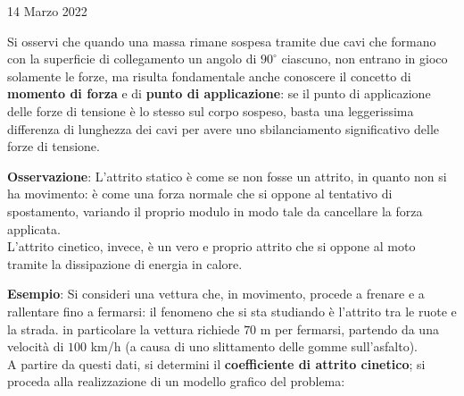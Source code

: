 \documentclass[a4paper]{extarticle}
\begin{document}
\newpage
\noindent
\begin{center}
  14 Marzo 2022
\end{center}
Si osservi che quando una massa rimane sospesa tramite due cavi che formano con la superficie di collegamento un angolo di $90^\circ$ ciascuno, non entrano in gioco solamente le forze, ma risulta fondamentale anche conoscere il concetto di \textbf{momento di forza} e di \textbf{punto di applicazione}: se il punto di applicazione delle forze di tensione è lo stesso sul corpo sospeso, basta una leggerissima differenza di lunghezza dei cavi per avere uno sbilanciamento significativo delle forze di tensione.

\vspace{1em}
\noindent
\textbf{Osservazione}: L'attrito statico è come se non fosse un attrito, in quanto non si ha movimento: è come una forza normale che si oppone al tentativo di spostamento, variando il proprio modulo in modo tale da cancellare la forza applicata.\\
L'attrito cinetico, invece, è un vero e proprio attrito che si oppone al moto tramite la dissipazione di energia in calore.

\vspace{1em}
\noindent
\textbf{Esempio}: Si consideri una vettura che, in movimento, procede a frenare e a rallentare fino a fermarsi: il fenomeno che si sta studiando è l'attrito tra le ruote e la strada. in particolare la vettura richiede $70$ m per fermarsi, partendo da una velocità di $100$ km/h (a causa di uno slittamento delle gomme sull'asfalto).\\
A partire da questi dati, si determini il \textbf{coefficiente di attrito cinetico}; si proceda alla realizzazione di un modello grafico del problema:
\end{document}
